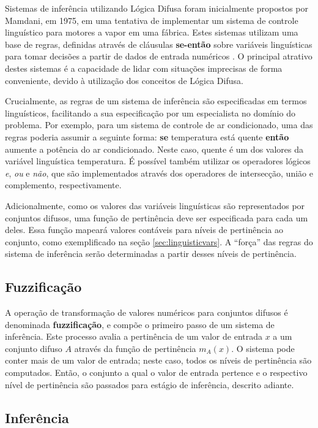 \documentclass[12pt]{article}
\begin{document}
Sistemas de inferência utilizando Lógica Difusa foram inicialmente propostos por Mamdani, em 1975, em uma tentativa de implementar um sistema de controle linguístico para motores a vapor em uma fábrica. Estes sistemas utilizam uma base de regras, definidas através de cláusulas \textbf{se-então} sobre variáveis linguísticas para tomar decisões a partir de dados de entrada numéricos \cite{Mamdani1975}. O principal atrativo destes sistemas é a capacidade de lidar com situações imprecisas de forma conveniente, devido à utilização dos conceitos de Lógica Difusa.

Crucialmente, as regras de um sistema de inferência são especificadas em termos linguísticos, facilitando a sua especificação por um especialista no domínio do problema. Por exemplo, para um sistema de controle de ar condicionado, uma das regras poderia assumir a seguinte forma: \textbf{se} temperatura está quente \textbf{então} aumente a potência do ar condicionado. Neste caso, quente é um dos valores da variável linguística temperatura. É possível também utilizar os operadores lógicos \textit{e}, \textit{ou} e \textit{não}, que são implementados através dos operadores de intersecção, união e complemento, respectivamente.

Adicionalmente, como os valores das variáveis linguísticas são representados por conjuntos difusos, uma função de pertinência deve ser especificada para cada um deles. Essa função mapeará valores contáveis para níveis de pertinência ao conjunto, como exemplificado na seção \ref{sec:linguisticvars}. A ``força'' das regras do sistema de inferência serão determinadas a partir desses níveis de pertinência.

\subsection{Fuzzificação} \label{sec:fuzzification}

A operação de transformação de valores numéricos para conjuntos difusos é denominada \textbf{fuzzificação}, e compõe o primeiro passo de um sistema de inferência. Este processo avalia a pertinência de um valor de entrada $x$ a um conjunto difuso $A$ através da função de pertinência $m_{A}(x)$. O sistema pode conter mais de um valor de entrada; neste caso, todos os níveis de pertinência são computados. Então, o conjunto a qual o valor de entrada pertence e o respectivo nível de pertinência são passados para estágio de inferência, descrito adiante.

\subsection{Inferência} \label{sec:inference}
\end{document}
